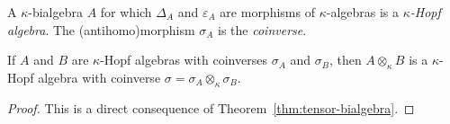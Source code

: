 \begin{defn}
    A $\kappa$-bialgebra $A$ for which $\Delta_A$ and $\varepsilon_A$ are morphisms of $\kappa$-algebras is a \textsl{$\kappa$-Hopf algebra}. The (antihomo)morphism $\sigma_A$ is the \textsl{coinverse}.
\end{defn}

\begin{thm}
    If\/ $A$ and\/ $B$ are\/ $\kappa$-Hopf algebras with coinverses\/ $\sigma_A$ and\/ $\sigma_B$, then\/ $A\otimes_\kappa B$ is a\/ $\kappa$-Hopf algebra with coinverse\/ $\sigma=\sigma_A\otimes_\kappa\sigma_B$.
\end{thm}

\begin{proof}
    This is a direct consequence of Theorem~\ref{thm:tensor-bialgebra}.
\end{proof}

